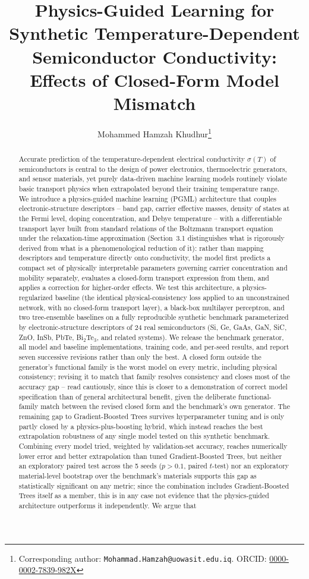 \documentclass[11pt]{article}
\title{\textbf{Physics-Guided Learning for Synthetic Temperature-Dependent Semiconductor Conductivity: Effects of Closed-Form Model Mismatch}}
\author[1]{Mohammed Hamzah Khudhur\thanks{Corresponding author: \texttt{Mohammad.Hamzah@uowasit.edu.iq}. ORCID: \href{https://orcid.org/0000-0002-7839-982X}{0000-0002-7839-982X}}}
\affil[1]{Department of Electrical Engineering, College of Engineering, University of Wasit, Kut, Iraq}
\date{}
\begin{document}
\maketitle

\begin{abstract}
\noindent
Accurate prediction of the temperature-dependent electrical conductivity $\sigma(T)$ of semiconductors is central to the design of power electronics, thermoelectric generators, and sensor materials, yet purely data-driven machine learning models routinely violate basic transport physics when extrapolated beyond their training temperature range. We introduce a physics-guided machine learning (PGML) architecture that couples electronic-structure descriptors -- band gap, carrier effective masses, density of states at the Fermi level, doping concentration, and Debye temperature -- with a differentiable transport layer built from standard relations of the Boltzmann transport equation under the relaxation-time approximation (Section~3.1 distinguishes what is rigorously derived from what is a phenomenological reduction of it): rather than mapping descriptors and temperature directly onto conductivity, the model first predicts a compact set of physically interpretable parameters governing carrier concentration and mobility separately, evaluates a closed-form transport expression from them, and applies a correction for higher-order effects. We test this architecture, a physics-regularized baseline (the identical physical-consistency loss applied to an unconstrained network, with no closed-form transport layer), a black-box multilayer perceptron, and two tree-ensemble baselines on a fully reproducible synthetic benchmark parameterized by electronic-structure descriptors of 24 real semiconductors (Si, Ge, GaAs, GaN, SiC, ZnO, InSb, PbTe, Bi$_2$Te$_3$, and related systems). We release the benchmark generator, all model and baseline implementations, training code, and per-seed results, and report seven successive revisions rather than only the best. A closed form outside the generator's functional family is the worst model on every metric, including physical consistency; revising it to match that family resolves consistency and closes most of the accuracy gap -- read cautiously, since this is closer to a demonstration of correct model specification than of general architectural benefit, given the deliberate functional-family match between the revised closed form and the benchmark's own generator. The remaining gap to Gradient-Boosted Trees survives hyperparameter tuning and is only partly closed by a physics-plus-boosting hybrid, which instead reaches the best extrapolation robustness of any single model tested on this synthetic benchmark. Combining every model tried, weighted by validation-set accuracy, reaches numerically lower error and better extrapolation than tuned Gradient-Boosted Trees, but neither an exploratory paired test across the 5 seeds ($p > 0.1$, paired $t$-test) nor an exploratory material-level bootstrap over the benchmark's materials supports this gap as statistically significant on any metric; since the combination includes Gradient-Boosted Trees itself as a member, this is in any case not evidence that the physics-guided architecture outperforms it independently. We argue that 
\end{abstract}
\end{document}
